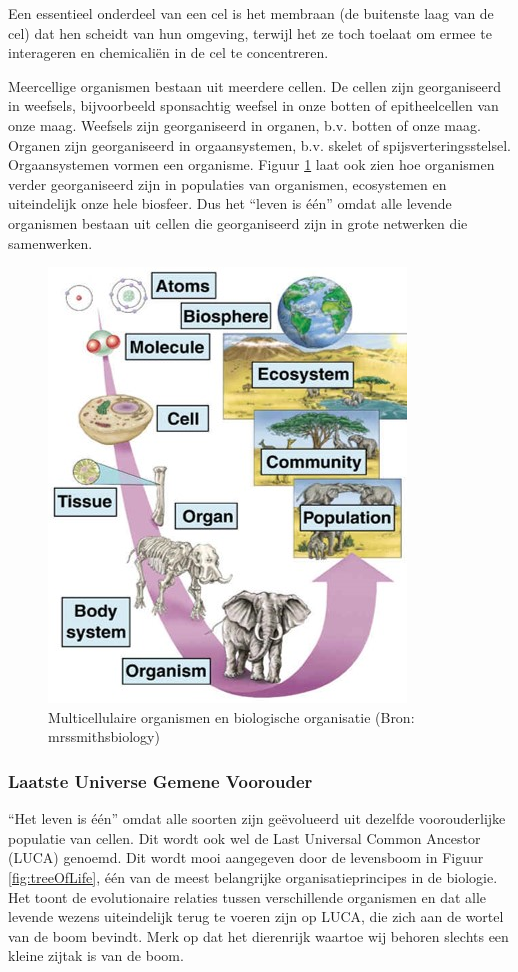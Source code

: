 \documentclass[
  11pt,
]{book}
\begin{document}
Een essentieel onderdeel van een cel is het membraan (de buitenste laag van de cel) dat hen scheidt van hun omgeving, terwijl het ze toch toelaat om ermee te interageren en chemicaliën in de cel te concentreren.

Meercellige organismen bestaan uit meerdere cellen. De cellen zijn georganiseerd in weefsels, bijvoorbeeld sponsachtig weefsel in onze botten of epitheelcellen van onze maag. Weefsels zijn georganiseerd in organen, b.v. botten of onze maag. Organen zijn georganiseerd in orgaansystemen, b.v. skelet of spijsverteringsstelsel. Orgaansystemen vormen een organisme. Figuur \ref{fig:multiCellular} laat ook zien hoe organismen verder georganiseerd zijn in populaties van organismen, ecosystemen en uiteindelijk onze hele biosfeer. Dus het ``leven is één'' omdat alle levende organismen bestaan uit cellen die georganiseerd zijn in grote netwerken die samenwerken.

\begin{figure}

{\centering \includegraphics[width=0.3\linewidth]{./figs/organisationMulticellular} 

}

\caption{Multicellulaire organismen en biologische organisatie (Bron: mrssmithsbiology)}\label{fig:multiCellular}
\end{figure}

\pagebreak

\hypertarget{laatste-universe-gemene-voorouder}{%
\subsubsection{Laatste Universe Gemene Voorouder}\label{laatste-universe-gemene-voorouder}}

``Het leven is één'' omdat alle soorten zijn geëvolueerd uit dezelfde voorouderlijke populatie van cellen. Dit wordt ook wel de Last Universal Common Ancestor (LUCA) genoemd. Dit wordt mooi aangegeven door de levensboom in Figuur \ref{fig:treeOfLife}, één van de meest belangrijke organisatieprincipes in de biologie. Het toont de evolutionaire relaties tussen verschillende organismen en dat alle levende wezens uiteindelijk terug te voeren zijn op LUCA, die zich aan de wortel van de boom bevindt. Merk op dat het dierenrijk waartoe wij behoren slechts een kleine zijtak is van de boom.
\end{document}
